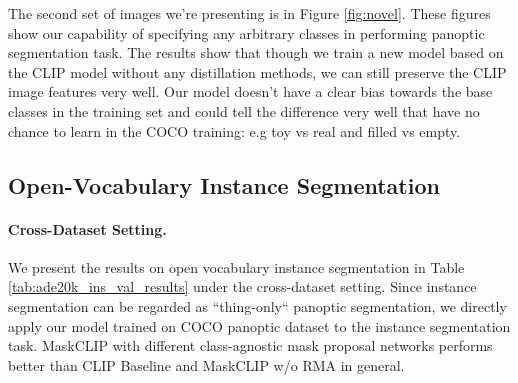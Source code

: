 \documentclass{article}
\theoremstyle{plain}
\theoremstyle{definition}
\theoremstyle{remark}
\begin{document}
The second set of images we're presenting is in Figure \ref{fig:novel}. These figures show our capability of specifying any arbitrary classes in performing panoptic segmentation task. The results show that though we train a new model based on the CLIP model without any distillation methods, we can still preserve the CLIP image features very well. Our model doesn't have a clear bias towards the base classes in the training set and could tell the difference very well that have no chance to learn in the COCO training: e.g toy vs real and filled vs empty.

\subsection{Open-Vocabulary Instance Segmentation}

\paragraph{Cross-Dataset Setting.} We present the results on open vocabulary instance segmentation in Table \ref{tab:ade20k_ins_val_results} under the cross-dataset setting. Since instance segmentation can be regarded as ``thing-only`` panoptic segmentation, we directly apply our model trained on COCO panoptic dataset to the instance segmentation task. MaskCLIP with different class-agnostic mask proposal networks performs better than CLIP Baseline and MaskCLIP w/o RMA in general. 

\begin{table}[H]
\begin{center}
\caption{\small \textbf{Results on open-vocabulary instance segmentation under the cross-dataset setting.} }
\label{tab:ade20k_ins_val_results}
\end{center}
\end{table}
\end{document}
